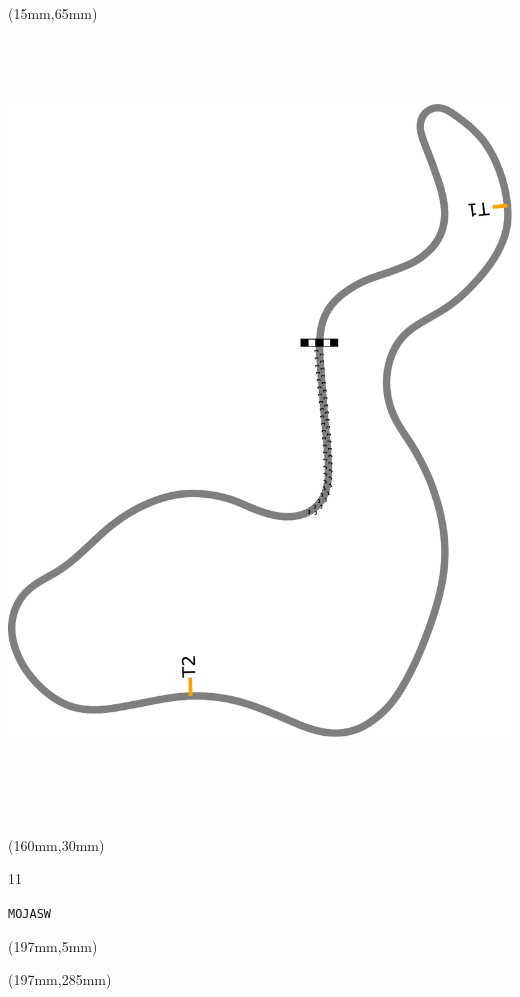 \begin{textblock*}{185mm}(15mm,65mm)%
\centering
\mbox{\includegraphics[width=185mm,height=210mm,keepaspectratio]{PT/MOJASW.pdf}}
\end{textblock*}
\begin{textblock*}{40mm}(160mm,30mm)%
\Large
\par{} 
\par11 
\par\hfill\tiny\tt MOJASW\\
\end{textblock*}
\begin{textblock*}{20mm}(197mm,5mm)%
\fbox{\thepage}
\label{MOJASW}
\end{textblock*}
\begin{textblock*}{20mm}(197mm,285mm)%
\fbox{\thepage}
\end{textblock*}

